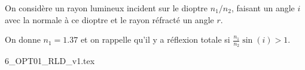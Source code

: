 	
	
	
	\finEntrainement
	
	
	
		
	
	\titreEntrainementFacultatif	{}
	\hauteurLargeurCadreReponse		{7mm}{1.5cm}
	\initialisationEntrainement
	
	
	\initialisationPartieGauche %
	On considère un rayon lumineux incident sur le dioptre $n_1/n_2$, faisant un angle $i$ avec la normale à ce dioptre et le rayon réfracté un angle $r$.
	\smallskip
	
	On donne $n_1=\num{1.37}$ et on rappelle qu'il y a réflexion totale si $\frac{n_1}{n_2}\sin(i)>1$.
	
	
	\initialisationPartieDroite %
	\begin{center}
		{6_OPT01_RLD_v1.tex}
	\end{center}
	\finalisationDuPartageDePage %
	
